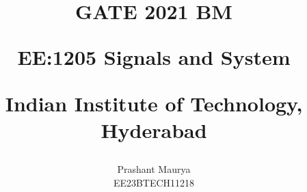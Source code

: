 \documentclass[journal,12pt,twocolumn]{IEEEtran}
\theoremstyle{remark}
\begin{document}
%




\vspace{3cm}

\title{
GATE 2021 BM

\large{EE:1205 Signals and System}

Indian Institute of Technology, Hyderabad
}
\author{Prashant Maurya

EE23BTECH11218
}	


%
%
%

% 
%



% 
\end{document}
